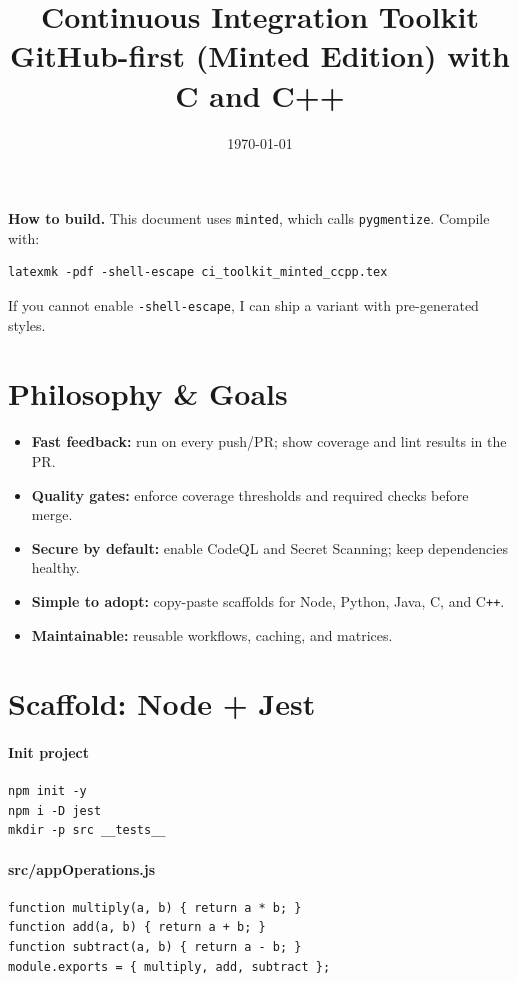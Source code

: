 \documentclass[11pt]{article}
\title{\textbf{Continuous Integration Toolkit}\\\large GitHub-first (Minted Edition) with C and C++}
\author{}
\date{\today}
\begin{document}
\maketitle
\tableofcontents
\newpage

\begin{tcolorbox}
\textbf{How to build.} This document uses \texttt{minted}, which calls \texttt{pygmentize}. Compile with:
\begin{verbatim}
latexmk -pdf -shell-escape ci_toolkit_minted_ccpp.tex
\end{verbatim}
If you cannot enable \texttt{-shell-escape}, I can ship a \textit{} variant with pre-generated styles.
\end{tcolorbox}

\section{Philosophy \& Goals}
\begin{itemize}
  \item \textbf{Fast feedback:} run on every push/PR; show coverage and lint results in the PR.
  \item \textbf{Quality gates:} enforce coverage thresholds and required checks before merge.
  \item \textbf{Secure by default:} enable CodeQL and Secret Scanning; keep dependencies healthy.
  \item \textbf{Simple to adopt:} copy-paste scaffolds for Node, Python, Java, C, and C\texttt{++}.
  \item \textbf{Maintainable:} reusable workflows, caching, and matrices.
\end{itemize}

\section{Scaffold: Node + Jest}
\paragraph{Init project}
\begin{verbatim}
npm init -y
npm i -D jest
mkdir -p src __tests__
\end{verbatim}

\paragraph{src/appOperations.js}
\begin{verbatim}
function multiply(a, b) { return a * b; }
function add(a, b) { return a + b; }
function subtract(a, b) { return a - b; }
module.exports = { multiply, add, subtract };
\end{verbatim}
\clearpage
\end{document}

